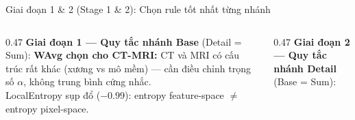 \documentclass[t, aspectratio=169]{beamer}
\begin{document}
\begin{frame}{Giai đoạn 1 \& 2 (Stage 1 \& 2): Chọn rule tốt nhất từng nhánh}
    \begin{columns}[T]
        \begin{column}{0.47\textwidth}
            \small\textbf{Giai đoạn 1 --- Quy tắc nhánh Base} (Detail = Sum):
            \vspace{0.2em}
            \vspace{0.2em}
            \small\textbf{WAvg chọn cho CT-MRI:} CT và MRI có cấu trúc rất khác (xương vs mô mềm) --- cần điều chỉnh trọng số $\alpha$, không trung bình cứng nhắc.\\
            \alert{LocalEntropy sụp đổ} ($-0.99$): entropy feature-space $\neq$ entropy pixel-space.
        \end{column}
        \begin{column}{0.47\textwidth}
            \small\textbf{Giai đoạn 2 --- Quy tắc nhánh Detail} (Base = Sum):
            \vspace{0.2em}
\end{column}
\end{columns}
\end{frame}
\end{document}
